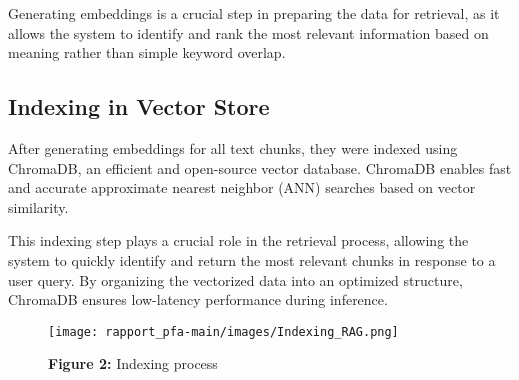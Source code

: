 Generating embeddings is a crucial step in preparing the data for retrieval, as it allows the system to identify and rank the most relevant information based on meaning rather than simple keyword overlap.

\subsection{Indexing in Vector Store}
\label{subsec:indexing}

After generating embeddings for all text chunks, they were indexed using ChromaDB, an efficient and open-source vector database. ChromaDB enables fast and accurate approximate nearest neighbor (ANN) searches based on vector similarity.

This indexing step plays a crucial role in the retrieval process, allowing the system to quickly identify and return the most relevant chunks in response to a user query. By organizing the vectorized data into an optimized structure, ChromaDB ensures low-latency performance during inference.

\begin{figure}[htbp]
  \centering
  \texttt{[image: rapport\_pfa-main/images/Indexing\_RAG.png]}
  \caption*{\textbf{Figure 2:} Indexing process} %
  \label{fig:indexing-process-manual}
\end{figure}

